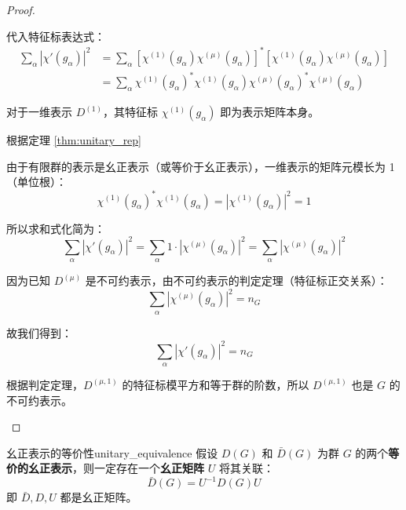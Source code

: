 \begin{proof}
\begin{itemize}
    代入特征标表达式：
    \begin{equation}
        \begin{aligned}
            \sum_{\alpha} |\chi'(g_\alpha)|^2 &= \sum_{\alpha} [\chi^{(1)}(g_\alpha) \chi^{(\mu)}(g_\alpha)]^* [\chi^{(1)}(g_\alpha) \chi^{(\mu)}(g_\alpha)] \\
            &= \sum_{\alpha} \chi^{(1)}(g_\alpha)^* \chi^{(1)}(g_\alpha) \chi^{(\mu)}(g_\alpha)^* \chi^{(\mu)}(g_\alpha)
        \end{aligned}
    \end{equation}
    
    对于一维表示 $D^{(1)}$，其特征标 $\chi^{(1)}(g_\alpha)$ 即为表示矩阵本身。

    根据定理 \ref{thm:unitary_rep}

    由于有限群的表示是幺正表示（或等价于幺正表示），一维表示的矩阵元模长为 1（单位根）：
    \begin{equation}
        \chi^{(1)}(g_\alpha)^* \chi^{(1)}(g_\alpha) = |\chi^{(1)}(g_\alpha)|^2 = 1
    \end{equation}
    
    所以求和式化简为：
    \begin{equation}
        \sum_{\alpha} |\chi'(g_\alpha)|^2 = \sum_{\alpha} 1 \cdot |\chi^{(\mu)}(g_\alpha)|^2 = \sum_{\alpha} |\chi^{(\mu)}(g_\alpha)|^2
    \end{equation}
    
    因为已知 $D^{(\mu)}$ 是不可约表示，由不可约表示的判定定理（特征标正交关系）：
    \begin{equation}
        \sum_{\alpha} |\chi^{(\mu)}(g_\alpha)|^2 = n_G
    \end{equation}
    
    故我们得到：
    \begin{equation}
        \sum_{\alpha} |\chi'(g_\alpha)|^2 = n_G
    \end{equation}
    
    根据判定定理，$D^{(\mu,1)}$ 的特征标模平方和等于群的阶数，所以 $D^{(\mu,1)}$ 也是 $G$ 的不可约表示。
\end{itemize}
\end{proof}

\begin{theorem}{幺正表示的等价性}{unitary_equivalence}
    假设 $D(G)$ 和 $\bar{D}(G)$ 为群 $G$ 的两个\textbf{等价的幺正表示}，则一定存在一个\textbf{幺正矩阵} $U$ 将其关联：
    \begin{equation}
        \bar{D}(G) = U^{-1}D(G)U
    \end{equation}
    即 $\bar{D}, D, U$ 都是幺正矩阵。
\end{theorem}

